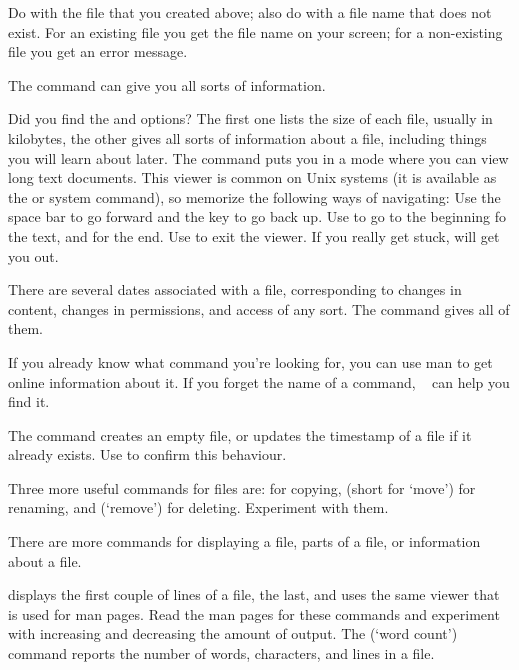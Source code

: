 \practical
{Do  with the file that you created above; also do
   with a file name that does not exist.}
{For an existing file you get the file name on your screen; for a
  non-existing file you get an error message.}
{}

The  command can give you all sorts of information.

{Did you find the  and 
  options? The first one lists the size of each file, usually in
  kilobytes, the other gives all sorts of information about a file,
  including things you will learn about later.}  
{The  command
  puts you in a mode where you can view long text documents. This
  viewer is common on Unix systems (it is available as the  or
   system command), so memorize the following ways of navigating: Use
  the space bar to go forward and the  key to go back up. Use
   to go to the beginning fo the text, and  for the end. Use
   to exit the viewer. If you really get stuck,  will
  get you out.}

\begin{remark}
  There are several dates associated with a file, corresponding to
  changes in content, changes in permissions, and access of any
  sort. The  command gives all of them.
\end{remark}
\begin{remark}
  If you already know what command you're looking for, you can use man
  to get online information about it. If you forget the name of a
  command, ~ can help you find it.
\end{remark}

The  command creates an empty file, or updates the timestamp of
a file if it already exists. Use  to confirm this behaviour.

Three more useful commands for files are:  for copying, 
(short for `move') for renaming, and  (`remove') for deleting.
Experiment with them.

There are more commands for displaying a file, parts of a file, or
information about a file. 

{ displays the first couple of lines of a file,  the
  last, and  uses the same viewer that is used for man
  pages. Read the man pages for these commands and experiment with
  increasing and decreasing the amount of output. 
  The  (`word count') command reports the number of words,
  characters, and lines in a file.}{}

